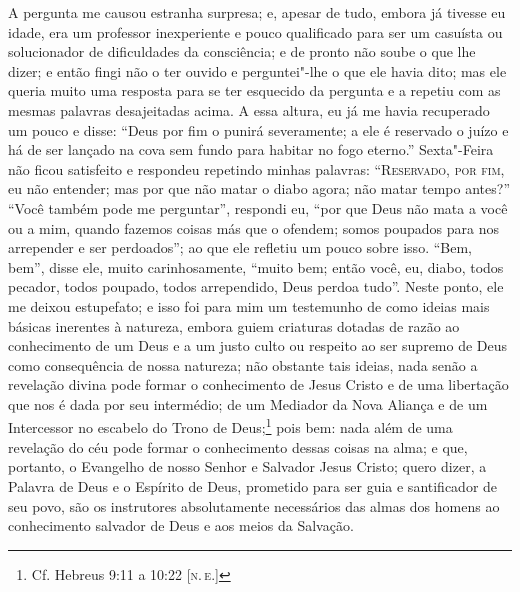 A pergunta me causou estranha surpresa; e, apesar de tudo, embora já
tivesse eu idade, era um professor inexperiente e pouco qualificado para
ser um casuísta ou solucionador de dificuldades da consciência; e de
pronto não soube o que lhe dizer; e então fingi não o ter ouvido e
perguntei"-lhe o que ele havia dito; mas ele queria muito uma resposta
para se ter esquecido da pergunta e a repetiu com as mesmas palavras
desajeitadas acima. A essa altura, eu já me havia recuperado um pouco e
disse: ``Deus por fim o punirá severamente; a ele é reservado o juízo e
há de ser lançado na cova sem fundo para habitar no fogo eterno.''
Sexta"-Feira não ficou satisfeito e respondeu repetindo minhas palavras:
``\textsc{Reservado, por fim,} eu não entender; mas por que não matar o
diabo agora; não matar tempo antes?'' ``Você também pode me perguntar'',
respondi eu, ``por que Deus não mata a você ou a mim, quando fazemos
coisas más que o ofendem; somos poupados para nos arrepender e ser
perdoados''; ao que ele refletiu um pouco sobre isso. ``Bem, bem'',
disse ele, muito carinhosamente, ``muito bem; então você, eu, diabo,
todos pecador, todos poupado, todos arrependido, Deus perdoa tudo''.
Neste ponto, ele me deixou estupefato; e isso foi para mim um testemunho
de como ideias mais básicas inerentes à natureza, embora guiem criaturas
dotadas de razão ao conhecimento de um Deus e a um justo culto ou
respeito ao ser supremo de Deus como consequência de nossa natureza; não
obstante tais ideias, nada senão a revelação divina pode formar o
conhecimento de Jesus Cristo e de uma libertação que nos é dada por seu
intermédio; de um Mediador da Nova Aliança e de um Intercessor no
escabelo do Trono de Deus;\footnote{Cf. Hebreus 9:11 a 10:22 {[}\textsc{n.\,e.}{]}}
pois bem: nada além de uma revelação do céu pode formar o conhecimento
dessas coisas na alma; e que, portanto, o Evangelho de nosso Senhor e
Salvador Jesus Cristo; quero dizer, a Palavra de Deus e o Espírito de
Deus, prometido para ser guia e santificador de seu povo, são os
instrutores absolutamente necessários das almas dos homens ao
conhecimento salvador de Deus e aos meios da Salvação.

